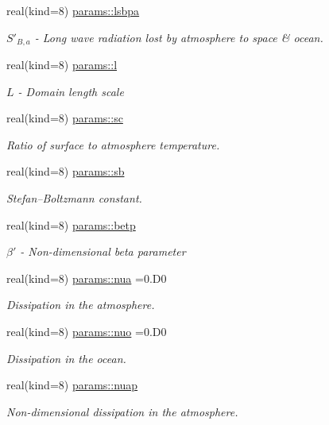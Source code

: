 \begin{DoxyCompactItemize}
real(kind=8) \hyperlink{namespaceparams_a2422205ab99f9886746672ee91b775a8}{params\+::lsbpa}
\begin{DoxyCompactList}\small\item\em $S'_{B,a}$ -\/ Long wave radiation lost by atmosphere to space \& ocean. \end{DoxyCompactList}\item 
real(kind=8) \hyperlink{namespaceparams_aa2b032a17c85d2069ca59212ad8309a1}{params\+::l}
\begin{DoxyCompactList}\small\item\em $L$ -\/ Domain length scale \end{DoxyCompactList}\item 
real(kind=8) \hyperlink{namespaceparams_a35c130eb539b9df8c52cc02427913cc0}{params\+::sc}
\begin{DoxyCompactList}\small\item\em Ratio of surface to atmosphere temperature. \end{DoxyCompactList}\item 
real(kind=8) \hyperlink{namespaceparams_a7e4a380117958612bc5cf4cac910b483}{params\+::sb}
\begin{DoxyCompactList}\small\item\em Stefan–\+Boltzmann constant. \end{DoxyCompactList}\item 
real(kind=8) \hyperlink{namespaceparams_a9ffe87bb8aaab8a0d4f8d5f644b98785}{params\+::betp}
\begin{DoxyCompactList}\small\item\em $\beta'$ -\/ Non-\/dimensional beta parameter \end{DoxyCompactList}\item 
real(kind=8) \hyperlink{namespaceparams_a8421c6937257007fb96366980677061c}{params\+::nua} =0.D0
\begin{DoxyCompactList}\small\item\em Dissipation in the atmosphere. \end{DoxyCompactList}\item 
real(kind=8) \hyperlink{namespaceparams_a49937b0c51e9f89ac9b2f332d387af2f}{params\+::nuo} =0.D0
\begin{DoxyCompactList}\small\item\em Dissipation in the ocean. \end{DoxyCompactList}\item 
real(kind=8) \hyperlink{namespaceparams_a3a0962facf5be13872568dd81f95453c}{params\+::nuap}
\begin{DoxyCompactList}\small\item\em Non-\/dimensional dissipation in the atmosphere. \end{DoxyCompactList}\item 

\end{DoxyCompactItemize}
